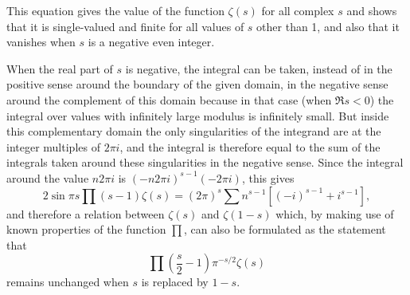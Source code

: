 This equation gives the value of the function $\zeta(s)$ for all complex
$s$ and shows that it is single-valued and finite for all values of $s$
other than 1, and also that it vanishes when $s$ is a negative even integer.

When the real part of $s$ is negative, the integral can be taken, instead
of in the positive sense around the boundary of the given domain, in the
negative sense around the complement of this domain because in that case
(when $\Re s < 0$) the integral over values with infinitely large modulus
is infinitely small. But inside this complementary domain the only singularities
of the integrand are at the integer multiples of $2\pi i$, and the integral 
is therefore equal to the sum of the integrals taken around these singularities
in the negative sense. Since the integral around the value $n2\pi i$ is
$(-n2\pi i)^{s-1}(-2\pi i)$, this gives
%
\[
2\sin\pi s\prod(s-1)\zeta(s) = (2\pi)^s\sum n^{s-1}[(-i)^{s-1} + i^{s-1}],
\]
%
and therefore a relation between $\zeta(s)$ and $\zeta(1-s)$ which, by making
use of known properties of the function $\prod$, can also be formulated as the
statement that
%
\[
\prod\left(\frac{s}{2} - 1\right)\pi^{-s/2}\zeta(s)
\]
%
remains unchanged when $s$ is replaced by $1-s$.

